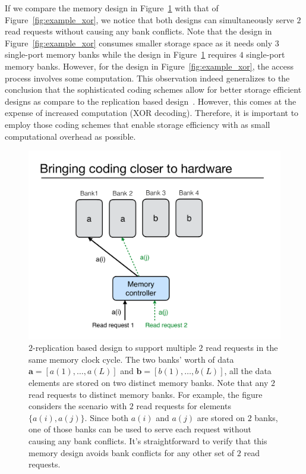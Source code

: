 \begin{remark}
\label{rem:read_only}
If we compare the memory design in Figure~\ref{fig:read_replication} with that of Figure~\ref{fig:example_xor}, we notice that both designs can simultaneously serve $2$ read requests without causing any bank conflicts. Note that the design in Figure~\ref{fig:example_xor} consumes smaller storage space as it needs only $3$ single-port memory banks while the design in  Figure~\ref{fig:read_replication} requires $4$ single-port memory banks. However, for the design in Figure~\ref{fig:example_xor}, the access process involves some computation. {\color{red}This observation indeed generalizes to the conclusion that the sophisticated coding schemes allow for better storage efficient designs as compare to the replication based design~\cite{MacSlo}. However, this comes at the expense of increased computation (XOR decoding). Therefore, it is important to employ those coding schemes that enable storage efficiency with as small computational overhead as possible.}
\end{remark}

\begin{figure}[t!]
\centering
\includegraphics[width=0.425\linewidth]{fig/read-replication.pdf}
\caption{$2$-replication based design to support multiple $2$ read requests in the same memory clock cycle. The two banks' worth of data $\mathbf{a} = [a(1),\ldots, a(L)]$ and $\mathbf{b} = [b(1),\ldots, b(L)]$, all the data elements are stored on two distinct memory banks. Note that any $2$ read requests to distinct memory banks. For example, the figure considers the scenario with $2$ read requests for elements $\{a(i), a(j)\}$. Since both $a(i)$ and $a(j)$ are stored on $2$ banks, one of those banks can be used to serve each request without causing any bank conflicts. It's straightforward to verify that this memory design avoids bank conflicts for any other set of $2$ read requests.}
\label{fig:read_replication}
\end{figure}

